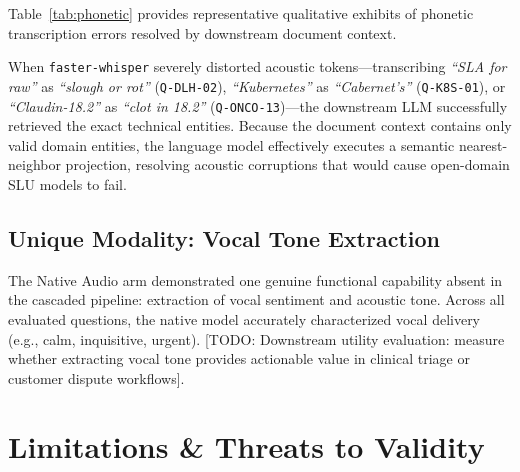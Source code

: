 \documentclass[10pt,a4paper,twocolumn]{article}
\begin{document}
Table~\ref{tab:phonetic} provides representative qualitative exhibits of phonetic transcription errors resolved by downstream document context.



When \texttt{faster-whisper} severely distorted acoustic tokens—transcribing \textit{``SLA for raw''} as \textit{``slough or rot''} (\texttt{Q-DLH-02}), \textit{``Kubernetes''} as \textit{``Cabernet's''} (\texttt{Q-K8S-01}), or \textit{``Claudin-18.2''} as \textit{``clot in 18.2''} (\texttt{Q-ONCO-13})—the downstream LLM successfully retrieved the exact technical entities. Because the document context contains only valid domain entities, the language model effectively executes a semantic nearest-neighbor projection, resolving acoustic corruptions that would cause open-domain SLU models to fail.

\subsection{Unique Modality: Vocal Tone Extraction}
The Native Audio arm demonstrated one genuine functional capability absent in the cascaded pipeline: extraction of vocal sentiment and acoustic tone. Across all evaluated questions, the native model accurately characterized vocal delivery (e.g., calm, inquisitive, urgent). [TODO: Downstream utility evaluation: measure whether extracting vocal tone provides actionable value in clinical triage or customer dispute workflows].

\section{Limitations \& Threats to Validity}
\label{sec:limitations}
\end{document}
